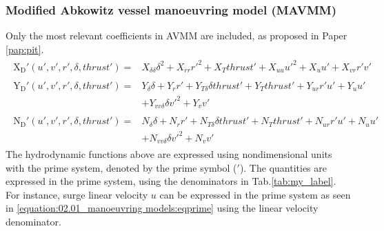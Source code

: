 \subsubsection*{\normalfont \textbf{Modified Abkowitz vessel manoeuvring model (MAVMM)}}
\newline
Only the most relevant coefficients in AVMM are included, as proposed in Paper \ref{pap:pit}.
\begin{equation}\label{equation:02.01_manoeuvring models:eqxmartinssimple}
\begin{split}\begin{split}
\operatorname{X_{D}'}{\left(u',v',r',\delta,thrust' \right)} = & X_{\delta\delta} \delta^{2} + X_{rr} r'^{2} + X_{T} thrust' + X_{uu} u'^{2} + X_{u} u' + X_{vr} r' v' 
\end{split}\end{split}
\end{equation}\begin{equation}\label{equation:02.01_manoeuvring models:eqymartinssimple}
\begin{split}\begin{split}
\operatorname{Y_{D}'}{\left(u',v',r',\delta,thrust' \right)} = & Y_{\delta} \delta + Y_{r} r' + Y_{T\delta} \delta thrust' + Y_{T} thrust' + Y_{ur} r' u' + Y_{u} u' \\ & + Y_{vv\delta} \delta v'^{2} + Y_{v} v' 
\end{split}\end{split}
\end{equation}\begin{equation}\label{equation:02.01_manoeuvring models:eqnmartinssimple}
\begin{split}\begin{split}
\operatorname{N_{D}'}{\left(u',v',r',\delta,thrust' \right)} = & N_{\delta} \delta + N_{r} r' + N_{T\delta} \delta thrust' + N_{T} thrust' + N_{ur} r' u' + N_{u} u' \\ & + N_{vv\delta} \delta v'^{2} + N_{v} v' 
\end{split}\end{split}
\end{equation}
\sphinxAtStartPar
The hydrodynamic functions above are expressed using nondimensional units with the prime system, denoted by the prime symbol (\('\)). The quantities are expressed in the prime system, using the denominators in Tab.\ref{tab:my_label}. For instance, surge linear velocity \(u\) can be expressed in the prime system as seen in \autoref{equation:02.01_manoeuvring models:eqprime} using the linear velocity denominator.
